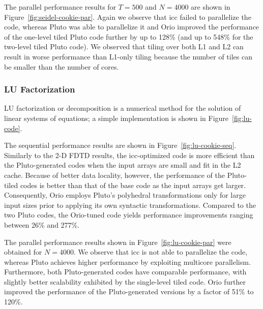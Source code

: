 The parallel performance results for $T=500$ and $N=4000$ are shown in
Figure~\ref{fig:seidel-cookie-par}. Again we observe that icc failed to
parallelize the code, whereas Pluto was able to parallelize it and Orio
improved the performance of the one-level tiled Pluto code further by up to
128\% (and up to 548\% for the two-level tiled Pluto code). We observed that
tiling over both L1 and L2 can result in worse performance than L1-only
tiling because the number of tiles can be smaller than the number of cores.


\subsubsection{LU Factorization}  
 
LU factorization or decomposition is a numerical method for the
solution of linear systems of equations; a simple implementation is
shown in Figure~\ref{fig:lu-code}.


The sequential performance results are shown in
Figure~\ref{fig:lu-cookie-seq}. Similarly to the 2-D FDTD results, the icc-optimized code is more
efficient than the Pluto-generated codes when the input arrays are small and
fit in the L2 cache. Because of better data locality, however, the
performance of the Pluto-tiled codes is better than that of the base code as
the input arrays get larger. 
Consequently, Orio employs Pluto's polyhedral transformations only for large
input sizes prior to applying its own syntactic transformations. 
Compared to the two Pluto codes, the
Orio-tuned code yields performance improvements ranging between 26\% and 277\%.

The parallel performance results shown in Figure~\ref{fig:lu-cookie-par} were
obtained for $N=4000$. We observe that icc is not able to parallelize the
code, whereas Pluto achieves higher performance by exploiting multicore
parallelism. Furthermore, both Pluto-generated codes have comparable
performance, with slightly better scalability exhibited by the single-level tiled
code. Orio further improved the performance of the Pluto-generated versions
by a factor of 51\% to 120\%.
 
